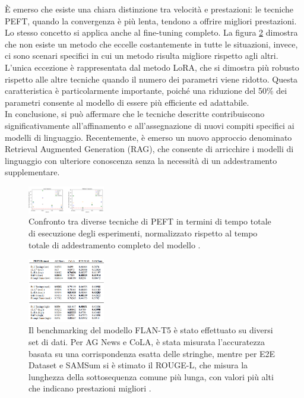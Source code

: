 È emerso che esiste una chiara distinzione tra velocità e prestazioni: le tecniche PEFT, quando la convergenza è più lenta, tendono a offrire migliori prestazioni. Lo stesso concetto si applica anche al fine-tuning completo.
La figura \ref{fig:PEFT-benchmarks} dimostra che non esiste un metodo che eccelle costantemente in tutte le situazioni, invece, ci sono scenari specifici in cui un metodo risulta migliore rispetto agli altri.
L'unica eccezione è rappresentata dal metodo LoRA, che si dimostra più robusto rispetto alle altre tecniche quando il numero dei parametri viene ridotto. Questa caratteristica è particolarmente importante, poiché una riduzione del 50\% dei parametri consente al modello di essere più efficiente ed adattabile.\\
In conclusione, si può affermare che le tecniche descritte contribuiscono significativamente all'affinamento e all'assegnazione di nuovi compiti specifici ai modelli di linguaggio. Recentemente, è emerso un nuovo approccio denominato Retrieval Augmented Generation (RAG), che consente di arricchire i modelli di linguaggio con ulteriore conoscenza senza la necessità di un addestramento supplementare.
\begin{figure}[ht]
	\centering
	\includegraphics[width=0.3\textwidth]{Immagini/low_medium_resources.png}
	\caption{Confronto tra diverse tecniche di PEFT in termini di tempo totale di esecuzione degli esperimenti, normalizzato rispetto al tempo totale di addestramento completo del modello \cite{pu2023empiricalanalysisstrengthsweaknesses}.}
	\label{fig:resources-scaling}
\end{figure}
\begin{figure}[ht]
	\centering
	\includegraphics[width=0.3\textwidth]{Immagini/PEFT-benchmarking.png}
	\caption{
        Il benchmarking del modello FLAN-T5 è stato effettuato su diversi set di dati. Per AG News e CoLA, è stata misurata l'accuratezza basata su una corrispondenza esatta delle stringhe, mentre per E2E Dataset e SAMSum si è stimato il ROUGE-L, che misura la lunghezza della sottosequenza comune più lunga, con valori più alti che indicano prestazioni migliori \cite{pu2023empiricalanalysisstrengthsweaknesses}.}
	\label{fig:PEFT-benchmarks}
\end{figure}

